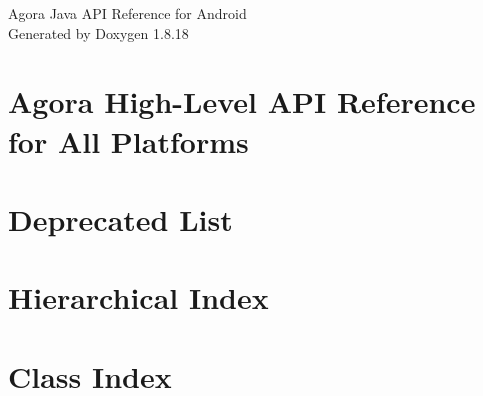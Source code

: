 \let\mypdfximage\pdfximage\def\pdfximage{\immediate\mypdfximage}\documentclass[twoside]{book}
\newcommand{\+}{\discretionary{\mbox{\scriptsize$\hookleftarrow$}}{}{}}
\newcommand{\clearemptydoublepage}{%
  \newpage{\pagestyle{empty}\cleardoublepage}%
}
\begin{document}
\hypersetup{pageanchor=false,
             bookmarksnumbered=true,
             pdfencoding=unicode
            }
\begin{titlepage}
\vspace*{7cm}
\begin{center}%
{\Large Agora Java A\+PI Reference for Android }\\
\vspace*{1cm}
{\large Generated by Doxygen 1.8.18}\\
\end{center}
\end{titlepage}
\clearemptydoublepage
{}
\tableofcontents
\clearemptydoublepage
{}
\hypersetup{pageanchor=true}

\chapter{Agora High-\/\+Level A\+PI Reference for All Platforms}
\label{index}\hypertarget{index}{}
\chapter{Deprecated List}
\label{deprecated}

\chapter{Hierarchical Index}

\chapter{Class Index}

\end{document}

